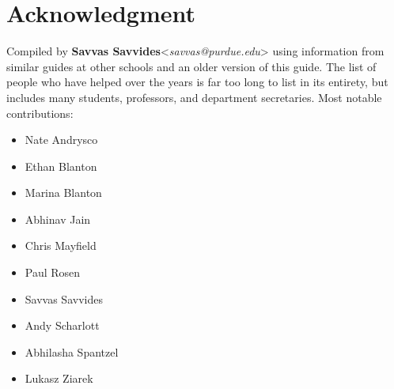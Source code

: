\section{Acknowledgment}
Compiled by \textbf{Savvas Savvides}<\emph{savvas@purdue.edu}> using information from similar guides at other schools and an older version of this guide.
%
The list of people who have helped over the years is far too long to list in its entirety, but includes many students, professors, and department secretaries. Most notable contributions:

\begin{itemize}
\item Nate Andrysco
\item Ethan Blanton
\item Marina Blanton
\item Abhinav Jain
\item Chris Mayfield
\item Paul Rosen
\item Savvas Savvides
\item Andy Scharlott
\item Abhilasha Spantzel
\item Lukasz Ziarek
\end{itemize}